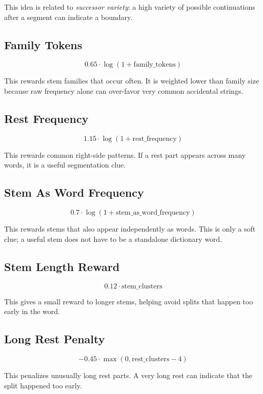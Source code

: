 \documentclass[11pt]{article}
\begin{document}
This idea is related to \textit{successor variety}: a high variety of possible
continuations after a segment can indicate a boundary.

\subsection*{Family Tokens}

\[
0.65 \cdot \log(1 + \text{family\_tokens})
\]

This rewards stem families that occur often. It is weighted lower than
family size because raw frequency alone can over-favor very common accidental
strings.

\subsection*{Rest Frequency}

\[
1.15 \cdot \log(1 + \text{rest\_frequency})
\]

This rewards common right-side patterns. If a rest part appears across many
words, it is a useful segmentation clue.

\subsection*{Stem As Word Frequency}

\[
0.7 \cdot \log(1 + \text{stem\_as\_word\_frequency})
\]

This rewards stems that also appear independently as words. This is only a soft
clue; a useful stem does not have to be a standalone dictionary word.

\subsection*{Stem Length Reward}

\[
0.12 \cdot \text{stem\_clusters}
\]

This gives a small reward to longer stems, helping avoid splits that happen too
early in the word.

\subsection*{Long Rest Penalty}

\[
-0.45 \cdot \max(0, \text{rest\_clusters} - 4)
\]

This penalizes unusually long rest parts. A very long rest can indicate that the
split happened too early.
\end{document}

